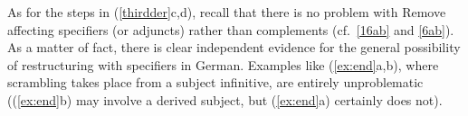 \documentclass[output=paper]{langsci/langscibook}
\begin{document}

As for the steps in (\ref{thirdder}c,d), recall that there is no problem with
Remove affecting specifiers (or adjuncts) rather than complements (cf.\
\eqref{16ab} and \eqref{6ab}). As a matter of fact, there is clear independent
evidence for the general possibility of restructuring with specifiers in
German.  Examples like (\ref{ex:end}a,b), where scrambling takes place from a
subject infinitive, are entirely unproblematic ((\ref{ex:end}b) may involve a
derived subject, but (\ref{ex:end}a) certainly does not).\newpage
\end{document}
